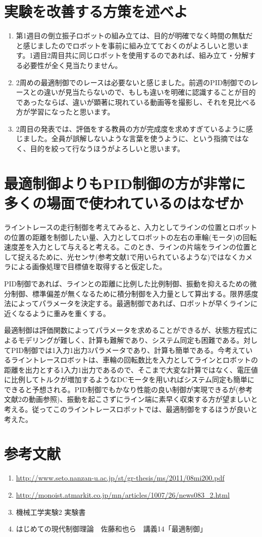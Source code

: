 \documentclass[a4j,twoside,openright,11pt]{jarticle}
\begin{document}
\section{実験を改善する方策を述べよ}
\begin{enumerate}
\item 第1週目の倒立振子ロボットの組み立ては、目的が明確でなく時間の無駄だと感じましたのでロボットを事前に組み立てておくのがよろしいと思います。1週目2周目共に同じロボットを使用するのであれば、組み立て・分解する必要性が全く見当たりません。
\item 2周めの最適制御でのレースは必要ないと感じました。前週のPID制御でのレースとの違いが見当たらないので、もしも違いを明確に認識することが目的であったならば、違いが顕著に現れている動画等を撮影し、それを見比べる方が学習になったと思います。
\item 2周目の発表では、評価をする教員の方が完成度を求めすぎているように感じました。全員が誤解しないような言葉を使うように、という指摘ではなく、目的を絞って行なうほうがよろしいと思います。
\end{enumerate}
\section{最適制御よりもPID制御の方が非常に多くの場面で使われているのはなぜか}
ライントレースの走行制御を考えてみると、入力としてラインの位置とロボットの位置の距離を制御したい量、入力としてロボットの左右の車輪(モータ)の回転速度差を入力として与えると考える。このとき、ラインの片端をラインの位置として捉えるために、光センサ(参考文献1で用いられているような)ではなくカメラによる画像処理で目標値を取得すると仮定した。
\par
PID制御であれば、ラインとの距離に比例した比例制御、振動を抑えるための微分制御、標準偏差が無くなるために積分制御を入力量として算出する。限界感度法によってパラメータを決定する。最適制御であれば、ロボットが早くラインに近くなるように重みを重くする。
\par
最適制御は評価関数によってパラメータを求めることができるが、状態方程式によるモデリングが難しく、計算も難解であり、システム同定も困難である。対してPID制御では1入力1出力3パラメータであり、計算も簡単である。今考えているライントレースロボットは、車輪の回転数比を入力としてラインとロボットの距離を出力とする1入力1出力であるので、そこまで大変な計算ではなく、電圧値に比例してトルクが増加するようなDCモータを用いればシステム同定も簡単にできると予想される。PID制御でもかなり性能の良い制御が実現できるが(参考文献2の動画参照)、振動を起こさずにライン端に素早く収束する方が望ましいと考える。従ってこのライントレースロボットでは、最適制御をするほうが良いと考えた。

\section{参考文献}
\begin{enumerate}
\item \url{http://www.seto.nanzan-u.ac.jp/st/gr-thesis/ms/2011/08mi200.pdf}
\item \url{http://monoist.atmarkit.co.jp/mn/articles/1007/26/news083_2.html}
\item 機械工学実験2 実験書
\item はじめての現代制御理論　佐藤和也ら　講義14「最適制御」
\end{enumerate}
\end{document}
